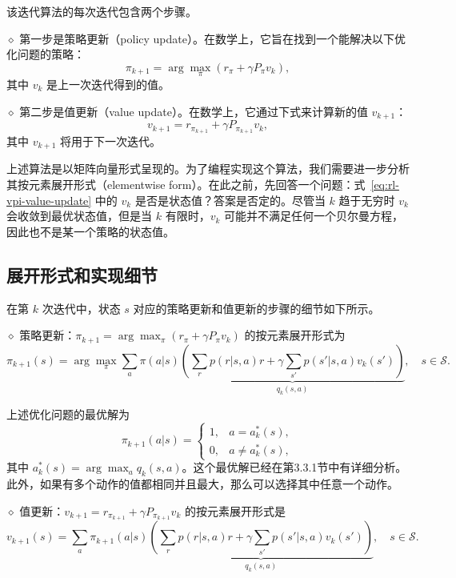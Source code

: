 该迭代算法的每次迭代包含两个步骤。

$\diamond$ 第一步是策略更新（policy update）。在数学上，它旨在找到一个能解决以下优化问题的策略：
\begin{equation}
\pi_{k+1} = \arg\max_{\pi} (r_{\pi} + \gamma P_{\pi} v_{k}),
\end{equation}
其中 $v_{k}$ 是上一次迭代得到的值。

$\diamond$ 第二步是值更新（value update）。在数学上，它通过下式来计算新的值 $v_{k+1}$：
\begin{equation}
\label{eq:rl-vpi-value-update}
v_{k+1} = r_{\pi_{k+1}} + \gamma P_{\pi_{k+1}} v_{k},
\end{equation}
其中 $v_{k+1}$ 将用于下一次迭代。

上述算法是以矩阵向量形式呈现的。为了编程实现这个算法，我们需要进一步分析其按元素展开形式（elementwise form）。在此之前，先回答一个问题：式~\eqref{eq:rl-vpi-value-update} 中的 $v_{k}$ 是否是状态值？答案是否定的。尽管当 $k$ 趋于无穷时 $v_{k}$ 会收敛到最优状态值，但是当 $k$ 有限时，$v_{k}$ 可能并不满足任何一个贝尔曼方程，因此也不是某一个策略的状态值。

\subsection{展开形式和实现细节}
\label{sec:rl-vpi-vi-elementwise}

在第 $k$ 次迭代中，状态 $s$ 对应的策略更新和值更新的步骤的细节如下所示。

$\diamond$ 策略更新：$\pi_{k+1}=\arg\max_{\pi}(r_{\pi}+\gamma P_{\pi}v_{k})$ 的按元素展开形式为
\begin{equation}
\pi_{k+1}(s) = \arg\max_{\pi} \sum_{a} \pi(a|s) \underbrace{\left(\sum_{r} p(r|s,a) r + \gamma \sum_{s'} p(s'|s,a) v_{k}(s')\right)}_{q_{k}(s,a)}, \quad s \in \mathcal{S}.
\end{equation}

上述优化问题的最优解为
\begin{equation}
\label{eq:rl-vpi-vi-greedy}
\pi_{k+1}(a|s) = \begin{cases} 1, & a = a_{k}^{*}(s), \\ 0, & a \neq a_{k}^{*}(s), \end{cases}
\end{equation}
其中 $a_{k}^{*}(s) = \arg\max_{a} q_{k}(s,a)$。这个最优解已经在第3.3.1节中有详细分析。此外，如果有多个动作的值都相同并且最大，那么可以选择其中任意一个动作。

$\diamond$ 值更新：$v_{k+1}=r_{\pi_{k+1}}+\gamma P_{\pi_{k+1}}v_{k}$ 的按元素展开形式是
\begin{equation}
v_{k+1}(s) = \sum_{a} \pi_{k+1}(a|s) \underbrace{\left(\sum_{r} p(r|s,a) r + \gamma \sum_{s'} p(s'|s,a) v_{k}(s')\right)}_{q_{k}(s,a)}, \quad s \in \mathcal{S}.
\end{equation}

